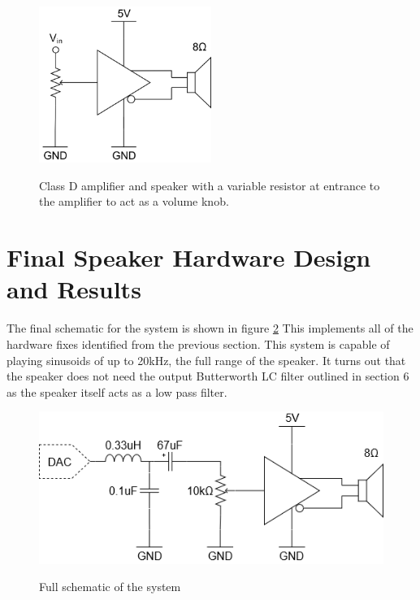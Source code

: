 \documentclass[12pt, a4paper]{article}
\begin{document}
\begin{figure}[!htb]
	\hfill\includegraphics[width=0.5\textwidth]{./Figures/Amplifier_And_Speaker}\hspace{\fill}
	\label{fig:SpeakerAndAmplifier}
	\caption{Class D amplifier and speaker with a variable resistor at entrance to the amplifier to act as a volume knob.}
\end{figure}

\section{Final Speaker Hardware Design and Results}
The final schematic for the system is shown in figure \ref{fig:FinalSchematic} This implements all of the hardware fixes identified from the previous section. This system is capable of playing sinusoids of up to 20kHz, the full range of the speaker. It turns out that the speaker does not need the output Butterworth LC filter outlined in section 6 as the speaker itself acts as a low pass filter. 
\begin{figure}[!htb]
	\hfill\includegraphics[width=\textwidth]{./Figures/System_Full_Schematic}\hspace{\fill}
	\label{fig:FinalSchematic}
	\caption{Full schematic of the system}
\end{figure}
\end{document}
